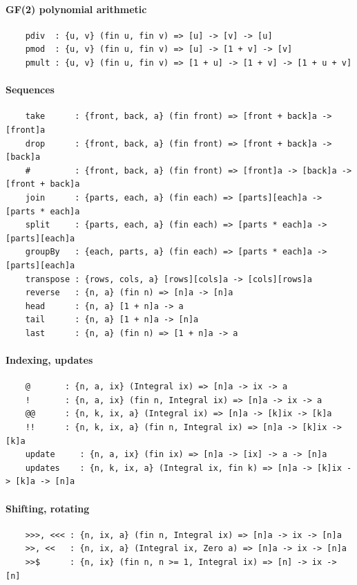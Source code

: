 \paragraph*{GF(2) polynomial arithmetic}
\begin{Verbatim}
    pdiv  : {u, v} (fin u, fin v) => [u] -> [v] -> [u]
    pmod  : {u, v} (fin u, fin v) => [u] -> [1 + v] -> [v]
    pmult : {u, v} (fin u, fin v) => [1 + u] -> [1 + v] -> [1 + u + v]
\end{Verbatim}
\paragraph*{Sequences}
\begin{Verbatim}
    take      : {front, back, a} (fin front) => [front + back]a -> [front]a
    drop      : {front, back, a} (fin front) => [front + back]a -> [back]a
    #         : {front, back, a} (fin front) => [front]a -> [back]a -> [front + back]a
    join      : {parts, each, a} (fin each) => [parts][each]a -> [parts * each]a
    split     : {parts, each, a} (fin each) => [parts * each]a -> [parts][each]a
    groupBy   : {each, parts, a} (fin each) => [parts * each]a -> [parts][each]a
    transpose : {rows, cols, a} [rows][cols]a -> [cols][rows]a
    reverse   : {n, a} (fin n) => [n]a -> [n]a
    head      : {n, a} [1 + n]a -> a
    tail      : {n, a} [1 + n]a -> [n]a
    last      : {n, a} (fin n) => [1 + n]a -> a
\end{Verbatim}
\paragraph*{Indexing, updates}
\begin{Verbatim}
    @       : {n, a, ix} (Integral ix) => [n]a -> ix -> a
    !       : {n, a, ix} (fin n, Integral ix) => [n]a -> ix -> a
    @@      : {n, k, ix, a} (Integral ix) => [n]a -> [k]ix -> [k]a
    !!      : {n, k, ix, a} (fin n, Integral ix) => [n]a -> [k]ix -> [k]a
    update     : {n, a, ix} (fin ix) => [n]a -> [ix] -> a -> [n]a
    updates    : {n, k, ix, a} (Integral ix, fin k) => [n]a -> [k]ix -> [k]a -> [n]a
\end{Verbatim}
\paragraph*{Shifting, rotating}
\begin{Verbatim}
    >>>, <<< : {n, ix, a} (fin n, Integral ix) => [n]a -> ix -> [n]a
    >>, <<   : {n, ix, a} (Integral ix, Zero a) => [n]a -> ix -> [n]a
    >>$      : {n, ix} (fin n, n >= 1, Integral ix) => [n] -> ix -> [n]
\end{Verbatim}
